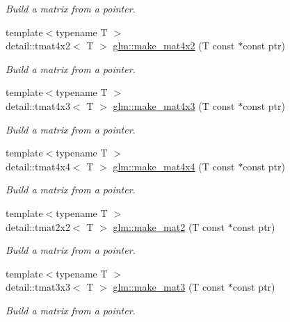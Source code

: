 \begin{DoxyCompactItemize}
\begin{DoxyCompactList}\small\item\em Build a matrix from a pointer. \end{DoxyCompactList}\item 
{\footnotesize template$<$typename T $>$ }\\detail\-::tmat4x2$<$ T $>$ \hyperlink{group__gtc__type__ptr_ga3717ecbb38c8a24043ee17bdff94bca5}{glm\-::make\-\_\-mat4x2} (T const $\ast$const ptr)
\begin{DoxyCompactList}\small\item\em Build a matrix from a pointer. \end{DoxyCompactList}\item 
{\footnotesize template$<$typename T $>$ }\\detail\-::tmat4x3$<$ T $>$ \hyperlink{group__gtc__type__ptr_gae91cc925c4154c5fe4ef1fc7da96a9a8}{glm\-::make\-\_\-mat4x3} (T const $\ast$const ptr)
\begin{DoxyCompactList}\small\item\em Build a matrix from a pointer. \end{DoxyCompactList}\item 
{\footnotesize template$<$typename T $>$ }\\detail\-::tmat4x4$<$ T $>$ \hyperlink{group__gtc__type__ptr_gaa287485a3978d319e60a1cadd8a1c139}{glm\-::make\-\_\-mat4x4} (T const $\ast$const ptr)
\begin{DoxyCompactList}\small\item\em Build a matrix from a pointer. \end{DoxyCompactList}\item 
{\footnotesize template$<$typename T $>$ }\\detail\-::tmat2x2$<$ T $>$ \hyperlink{group__gtc__type__ptr_gafd896ef261762a6ab412b61181d5ecae}{glm\-::make\-\_\-mat2} (T const $\ast$const ptr)
\begin{DoxyCompactList}\small\item\em Build a matrix from a pointer. \end{DoxyCompactList}\item 
{\footnotesize template$<$typename T $>$ }\\detail\-::tmat3x3$<$ T $>$ \hyperlink{group__gtc__type__ptr_gacd8f067b4fb7bd3d48663102b5178ef2}{glm\-::make\-\_\-mat3} (T const $\ast$const ptr)
\begin{DoxyCompactList}\small\item\em Build a matrix from a pointer. \end{DoxyCompactList}\item 

\end{DoxyCompactItemize}
